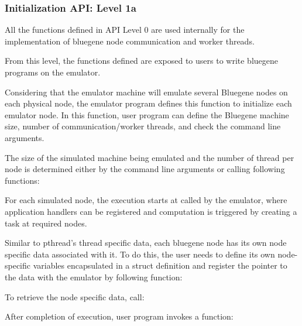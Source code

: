\subsubsection{Initialization API: Level 1a}

All the functions defined in API Level 0 are used internally for the 
implementation of bluegene node communication and worker threads.

From this level, the functions defined are exposed to users to write bluegene
programs on the emulator.

Considering that the emulator machine will emulate several Bluegene nodes on
each physical node, the emulator program defines this function 
 to initialize each emulator
node. In this function, user program can define the Bluegene machine size,
number of communication/worker threads, and check the command line arguments.

The size of the simulated machine being emulated and the number of thread per
node is determined either by the command line arguments or calling following
functions:





For each simulated node, the execution starts at 
 called by the emulator,
where application handlers can be registered and computation 
is triggered by creating a task at required nodes.

Similar to pthread's thread specific data, each bluegene node has its
own node specific data associated with it. To do this, the user needs to define its 
own node-specific variables encapsulated in a struct definition and register
 the pointer to the data with the emulator by following function:


To retrieve the node specific data, call:


After completion of execution, user program invokes a function:

